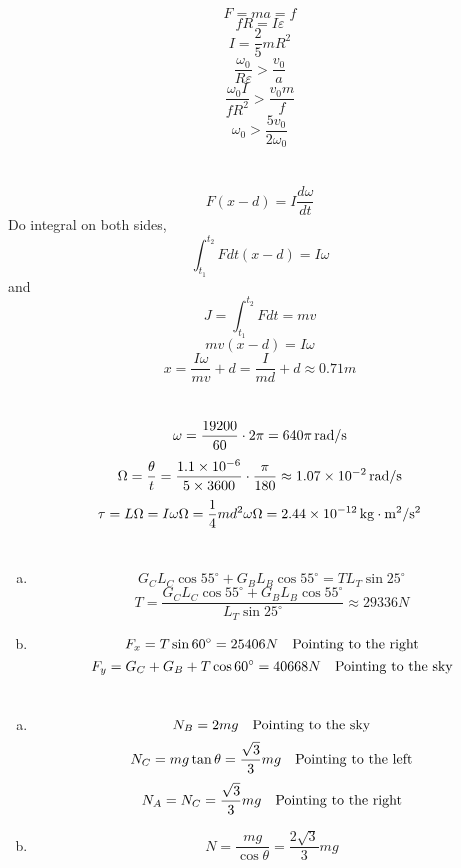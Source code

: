 \documentclass{article}
\begin{document}
\section{}
$$F=ma=f$$
$$fR=I\varepsilon$$
$$I=\frac{2}{5}mR^2$$
$$\frac{\omega_0}{R\varepsilon}>\frac{v_0}{a}$$
$$\frac{\omega_0I}{fR^2}>\frac{v_0m}{f}$$
$$\omega_0>\frac{5v_0}{2\omega_0}$$

\section{}
$$F(x-d)=I\frac{d\omega}{dt}$$
Do integral on both sides,
$$\int_{t_1}^{t_2}Fdt(x-d)=I\omega$$
and
$$J=\int_{t_1}^{t_2}Fdt=mv$$
$$mv(x-d)=I\omega$$
$$x=\frac{I\omega}{mv}+d=\frac{I}{md}+d\approx0.71m$$

\section{}
$$\omega=\frac{19200}{60}\cdot2\pi=640\pi\,\rm{rad/s}$$
$$\Omega=\frac{\theta}{t}=\frac{1.1\times10^{-6}}{5\times 3600}\cdot\frac{\pi}{180}\approx1.07\times10^{-2}\,\rm{rad/s}$$
$$\tau=L\Omega=I\omega\Omega=\frac{1}{4}md^2\omega\Omega=2.44\times10^{-12}\,\rm{kg\cdot m^2/s^2}$$

\section{}
\begin{enumerate}[(a)]
\item
$$G_CL_C\cos55^\circ+G_BL_B\cos55^\circ=TL_T\sin25^\circ$$
$$T=\frac{G_CL_C\cos55^\circ+G_BL_B\cos55^\circ}{L_T\sin25^\circ}\approx29336N$$
\item
$$F_x=T\sin60^\circ=25406N\quad\rm{Pointing\ to\ the\ right}$$
$$F_y=G_C+G_B+T\cos60^\circ=40668N\quad\rm{Pointing\ to\ the\ sky}$$
\end{enumerate}

\section{}
\begin{enumerate}[(a)]
\item
$$N_B=2mg\quad\rm{Pointing\ to\ the\ sky}$$
$$N_C=mg\tan\theta=\frac{\sqrt{3}}{3}mg\quad\rm{Pointing\ to\ the\ left}$$
$$N_A=N_C=\frac{\sqrt{3}}{3}mg\quad\rm{Pointing\ to\ the\ right}$$
\item
$$N=\frac{mg}{\cos\theta}=\frac{2\sqrt{3}}{3}mg$$
\end{enumerate}
\end{document}
